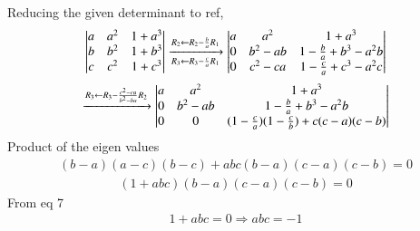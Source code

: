 \documentclass[journal,12pt,onecolumn]{IEEEtran}
\begin{document}
Reducing the given determinant to ref,
\begin{align}
		\begin{vmatrix}a &a^2 &1+ a^3\\ b & b^2 & 1 + b^3\\c & c^2 & 1 + c^3\end{vmatrix} \xrightarrow[R_3\leftarrow R_3-\frac{c}{a}R_1]{R_2\leftarrow R_2-\frac{b}{a}R_1} \begin{vmatrix}a &a^2 &1+ a^3\\ 0 & b^2-ab & 1-\frac{b}{a} + b^3-a^2b\\0 & c^2-ca &1 -\frac{c}{a}  + c^3-a^2c \end{vmatrix}
\end{align}
\begin{align}
\xrightarrow[]{R_3\leftarrow R_3-\frac{c^2-ca}{b^2-ba}R_2} \begin{vmatrix}a &a^2 &1+ a^3\\ 0 & b^2-ab & 1-\frac{b}{a} + b^3-a^2b\\0 & 0 & ( 1 -\frac{c}{a}) (1-\frac{c}{b})  + c(c-a)(c-b)\end{vmatrix}
\end{align}
Product of the eigen values 
\begin{align}
		(b-a)(a-c)(b-c)+abc(b-a)(c-a)(c-b) = 0 
\end{align}
\begin{align}
		(1+abc)(b-a)(c-a)(c-b) = 0 
\end{align}
From eq 7
\begin{align}
		1+abc = 0 \Rightarrow abc = -1 
\end{align}
\end{document}
